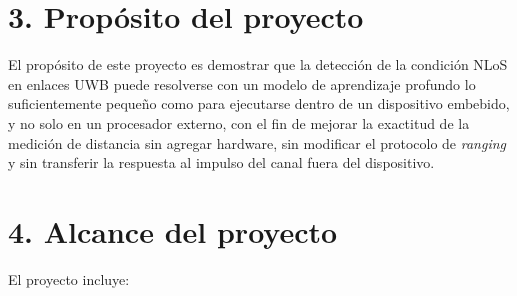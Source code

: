 \documentclass[
11pt, %
]{charter}
\begin{document}
\section{3. Propósito del proyecto}
\label{sec:proposito}

El propósito de este proyecto es demostrar que la detección de la condición NLoS en enlaces UWB puede resolverse con un modelo de aprendizaje profundo lo suficientemente pequeño como para ejecutarse dentro de un dispositivo embebido, y no solo en un procesador externo, con el fin de mejorar la exactitud de la medición de distancia sin agregar hardware, sin modificar el protocolo de \textit{ranging} y sin transferir la respuesta al impulso del canal fuera del dispositivo.

\section{4. Alcance del proyecto}
\label{sec:alcance}

El proyecto incluye:
\end{document}

